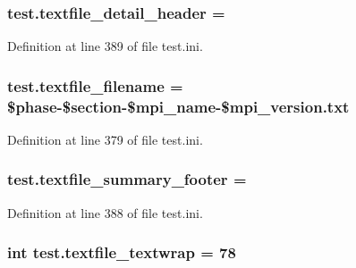 \hypertarget{namespacetest_a1149fe2728a88b0d33fdd5606ce953b2}{
\subsubsection[{textfile\-\_\-detail\-\_\-header}]{\setlength{\rightskip}{0pt plus 5cm}test.\-textfile\-\_\-detail\-\_\-header =}}\label{namespacetest_a1149fe2728a88b0d33fdd5606ce953b2}


Definition at line 389 of file test.\-ini.

\hypertarget{namespacetest_a39cdd407082b44f6d5bf56c03b99a745}{
\subsubsection[{textfile\-\_\-filename}]{\setlength{\rightskip}{0pt plus 5cm}test.\-textfile\-\_\-filename = \$phase-\/\$section-\/\$mpi\-\_\-name-\/\$mpi\-\_\-version.\-txt}}\label{namespacetest_a39cdd407082b44f6d5bf56c03b99a745}


Definition at line 379 of file test.\-ini.

\hypertarget{namespacetest_a9cf6c35d175b44931bbc0e7ee120ba6d}{
\subsubsection[{textfile\-\_\-summary\-\_\-footer}]{\setlength{\rightskip}{0pt plus 5cm}test.\-textfile\-\_\-summary\-\_\-footer =}}\label{namespacetest_a9cf6c35d175b44931bbc0e7ee120ba6d}


Definition at line 388 of file test.\-ini.

\hypertarget{namespacetest_a8f79316c7cc4b1d1ed80e5dbb71a8249}{
\subsubsection[{textfile\-\_\-textwrap}]{\setlength{\rightskip}{0pt plus 5cm}int test.\-textfile\-\_\-textwrap = 78}}\label{namespacetest_a8f79316c7cc4b1d1ed80e5dbb71a8249}


